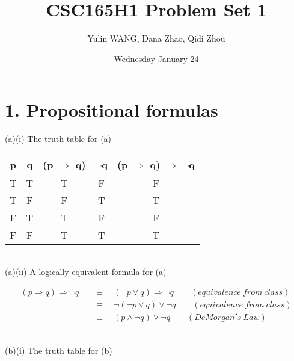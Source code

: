 \documentclass[12pt]{article}
\title{CSC165H1 Problem Set 1}
\author{Yulin WANG, Dana Zhao, Qidi Zhou}
\date{Wednesday January 24}
\begin{document}
\maketitle

\section*{1. Propositional formulas} 
\vspace{20pt}
(a)(i) The truth table for (a)


\vspace{20pt}

\begin{tabular}{c c c c c}

p & q & (p $\Rightarrow$ q) & $\neg$q & (p $\Rightarrow$ q) $\Rightarrow$ $\neg$q \\

\hline

T & T & T & F & F \\
T & F & F & T & T \\
F & T & T & F & F \\
F & F & T & T & T \\

\end{tabular}
\vspace{20pt}


~\\
(a)(ii) A logically equivalent formula for (a)

\vspace{20pt}

\begin{align*}
(p \Rightarrow q) \Rightarrow \neg q \quad &\equiv \quad (\neg p \vee q) \Rightarrow 
\neg q \qquad(equivalence\ from\ class) \\
&\equiv \quad \neg(\neg p \vee q) \vee \neg q \qquad(equivalence\ from\ class) \\
&\equiv \quad (p \wedge \neg q) \vee \neg q \qquad(DeMorgan's\ Law) 
\end{align*}

\vspace{20pt}

~\\
(b)(i) The truth table for (b)

\vspace{20pt}
\end{document}
